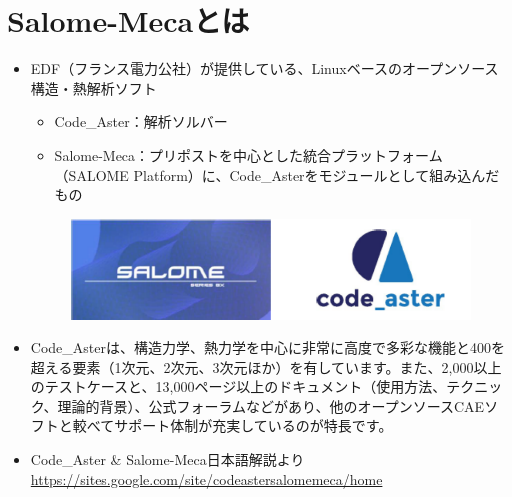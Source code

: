 \section{Salome-Mecaとは}
\begin{itemize}
	\item EDF（フランス電力公社）が提供している、Linuxベースのオープンソース構造・熱解析ソフト
	      \begin{itemize}
		      \item Code\_Aster：解析ソルバー
		      \item Salome-Meca：プリポストを中心とした統合プラットフォーム（SALOME Platform）に、Code\_Asterをモジュールとして組み込んだもの
	      \end{itemize}
	      \begin{figure}[htbp]
		      \centering
		      \includegraphics[width=0.4\linewidth]{fig/salome-aster.pdf}
	      \end{figure}
	\item Code\_Asterは、構造力学、熱力学を中心に非常に高度で多彩な機能と400を超える要素（1次元、2次元、3次元ほか）を有しています。また、2,000以上のテストケースと、13,000ページ以上のドキュメント（使用方法、テクニック、理論的背景）、公式フォーラムなどがあり、他のオープンソースCAEソフトと較べてサポート体制が充実しているのが特長です。
	\item Code\_Aster \& Salome-Meca日本語解説より
	      \href{https://sites.google.com/site/codeastersalomemeca/home}{https://sites.google.com/site/codeastersalomemeca/home}
\end{itemize}